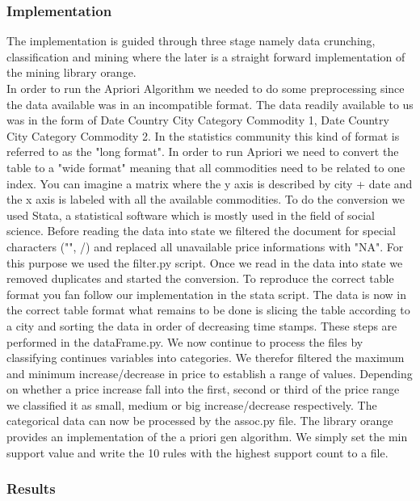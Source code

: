 \subsubsection{Implementation}

The implementation is guided through three stage namely data crunching, classification and  mining where the later is a straight forward implementation of the mining library orange. \\



In order to run the Apriori Algorithm we needed to do some preprocessing since the data available was in an incompatible format. The data readily available to us was in the form 
of Date Country City Category Commodity 1, Date Country City Category Commodity 2. In the statistics community this kind of format is referred to as the "long format". In order to run Apriori we need to convert the table to a "wide format" meaning that all commodities need to be related to one index. You can imagine a matrix where the y axis is described by city + date and the x axis is labeled with all the available commodities. To do the conversion we used Stata, a statistical software which is mostly used in the field of social science. Before reading the data into state we filtered the document for special characters ("", /) and replaced all unavailable price informations with "NA". For this purpose we used the filter.py script. Once we read in the data into state we removed duplicates and started the conversion. To reproduce the correct table format you fan follow our implementation in the stata script.  The data is now in the correct table format what remains to be done is slicing the table according to a city and sorting the data in order of decreasing time stamps. These steps are performed in the dataFrame.py. We now continue to process the files by classifying continues variables into categories. We therefor filtered the maximum and minimum increase/decrease in price to establish a range of values. Depending on whether a price increase fall into the first, second or third of the price range we classified it as small, medium or big increase/decrease respectively. The categorical data can now be processed by the assoc.py file. The library orange provides an implementation of the a priori gen algorithm. We simply set the min support value and write the 10 rules with the highest support count to a file. 

\subsubsection{Results}

